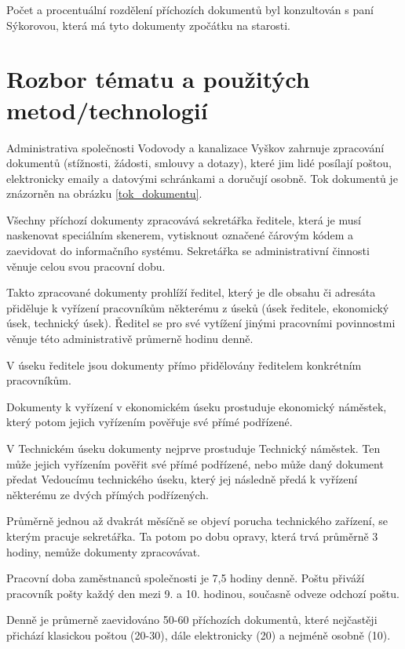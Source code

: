 \documentclass[12pt,a4paper]{article}
\begin{document}
Počet a procentuální rozdělení příchozích dokumentů byl konzultován s paní Sýkorovou, která má tyto dokumenty zpočátku na starosti.

\newpage


\section{Rozbor tématu a použitých metod/technologií}

Administrativa společnosti Vodovody a kanalizace Vyškov zahrnuje zpracování dokumentů (stížnosti, žádosti, smlouvy a dotazy), které jim lidé posílají poštou, elektronicky emaily a datovými schránkami a doručují osobně. Tok dokumentů je znázorněn na obrázku \ref{tok_dokumentu}.

Všechny příchozí dokumenty zpracovává sekretářka ředitele, která je musí naskenovat speciálním skenerem, vytisknout označené čárovým kódem a zaevidovat do informačního systému. Sekretářka se administrativní činnosti věnuje celou svou pracovní dobu.

Takto zpracované dokumenty prohlíží ředitel, který je dle obsahu či adresáta při\-dě\-lu\-je k vyřízení pracovníkům některému z úseků (úsek ředitele, ekonomický úsek, technický úsek). Ředitel se pro své vytížení jinými pracovními povinnostmi věnuje této administrativě průmerně hodinu denně.

V úseku ředitele jsou dokumenty přímo přidělovány ředitelem konkrétním pra\-cov\-ní\-kům.

Dokumenty k vyřízení v ekonomickém úseku prostuduje ekonomický náměstek, který potom jejich vyřízením pověřuje své přímé podřízené.

V Technickém úseku dokumenty nejprve prostuduje Technický náměstek. Ten může jejich vyřízením pověřit své přímé podřízené, nebo může daný dokument předat Vedoucímu technického úseku, který jej následně předá k vyřízení některému ze dvých přímých podřízených.

Průměrně jednou až dvakrát měsíčně se objeví porucha technického zařízení, se kterým pracuje sekretářka. Ta potom po dobu opravy, která trvá průměrně 3 hodiny, nemůže dokumenty zpracovávat.

Pracovní doba zaměstnanců společnosti je 7,5 hodiny denně. Poštu přiváží pracovník pošty každý den mezi 9. a 10. hodinou, současně odveze odchozí poštu.

Denně je průmerně zaevidováno 50-60 příchozích dokumentů, které nejčastěji při\-chá\-zí klasickou poštou (20-30), dále elektronicky (20) a nejméně osobně (10).
\end{document}

